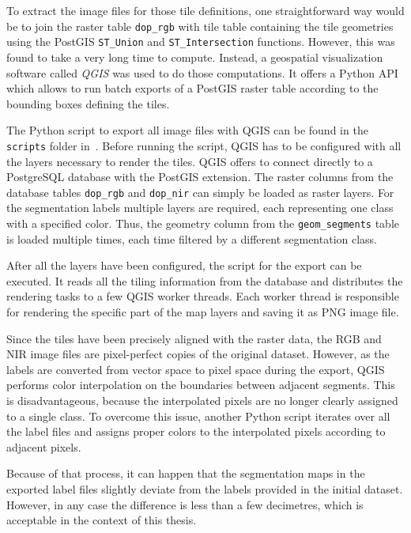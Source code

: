 To extract the image files for those tile definitions, one straightforward way would be to join the raster table \texttt{dop\_rgb} with tile table containing the tile geometries using the PostGIS \texttt{ST\_Union} and \texttt{ST\_Intersection} functions. However, this was found to take a very long time to compute. Instead, a geospatial visualization software called \emph{QGIS} was used to do those computations. It offers a Python API which allows to run batch exports of a PostGIS raster table according to the bounding boxes defining the tiles.

The Python script to export all image files with QGIS can be found in the \texttt{scripts} folder in~\cite{thesis-code20}. Before running the script, QGIS has to be configured with all the layers necessary to render the tiles. QGIS offers to connect directly to a PostgreSQL database with the PostGIS extension. The raster columns from the database tables \texttt{dop\_rgb} and \texttt{dop\_nir} can simply be loaded as raster layers. For the segmentation labels multiple layers are required, each representing one class with a specified color. Thus, the geometry column from the \texttt{geom\_segments} table is loaded multiple times, each time filtered by a different segmentation class.

After all the layers have been configured, the script for the export can be executed. It reads all the tiling information from the database and distributes the rendering tasks to a few QGIS worker threads. Each worker thread is responsible for rendering the specific part of the map layers and saving it as PNG image file.

Since the tiles have been precisely aligned with the raster data, the RGB and NIR image files are pixel-perfect copies of the original dataset. However, as the labels are converted from vector space to pixel space during the export, QGIS performs color interpolation on the boundaries between adjacent segments. This is disadvantageous, because the interpolated pixels are no longer clearly assigned to a single class. To overcome this issue, another Python script iterates over all the label files and assigns proper colors to the interpolated pixels according to adjacent pixels.

Because of that process, it can happen that the segmentation maps in the exported label files slightly deviate from the labels provided in the initial dataset. However, in any case the difference is less than a few decimetres, which is acceptable in the context of this thesis.

